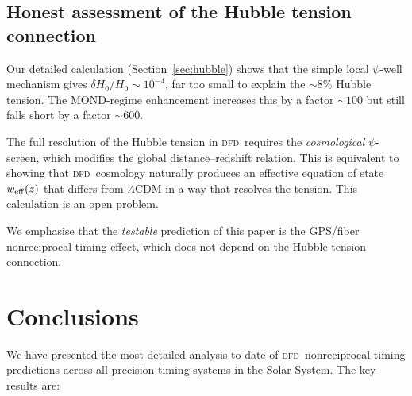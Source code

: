 \documentclass[aps,prl,twocolumn,superscriptaddress,showpacs]{revtex4-2}
\newcommand{\DFD}{\textsc{dfd}}
\begin{document}
\subsection{Honest assessment of the Hubble tension connection}

Our detailed calculation (Section~\ref{sec:hubble}) shows that the
simple local $\psi$-well mechanism gives $\delta H_0/H_0 \sim 10^{-4}$,
far too small to explain the $\sim 8\%$ Hubble tension.  The MOND-regime
enhancement increases this by a factor $\sim 100$ but still falls
short by a factor $\sim 600$.

The full resolution of the Hubble tension in \DFD\ requires the
\emph{cosmological} $\psi$-screen, which modifies the global
distance--redshift relation.  This is equivalent to showing that
\DFD\ cosmology naturally produces an effective equation of state
$w_{\rm eff}(z)$ that differs from $\Lambda$CDM in a way that
resolves the tension.  This calculation is an open problem.

We emphasise that the \emph{testable} prediction of this paper is
the GPS/fiber nonreciprocal timing effect, which does not depend
on the Hubble tension connection.

\section{Conclusions}\label{sec:conclusions}

We have presented the most detailed analysis to date of \DFD\
nonreciprocal timing predictions across all precision timing
systems in the Solar System.  The key results are:
\end{document}
